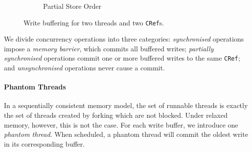 \begin{figure}
\begin{subfigure}{0.3\textwidth}
    \caption{Partial Store Order}
  \end{subfigure}
  \caption{Write buffering for two threads and two \texttt{CRef}s.}
  \label{fig:wb}
\end{figure}

We divide concurrency operations into three categories: \emph{synchronised}
operations impose a \emph{memory barrier}, which commits all buffered writes;
\emph{partially synchronised} operations commit one or more buffered writes to
the same \verb|CRef|; and \emph{unsynchronised} operations never cause a commit.

\paragraph{Phantom Threads}
In a sequentially consistent memory model, the set of runnable threads is
exactly the set of threads created by forking which are not blocked.  Under
relaxed memory, however, this is not the case.  For each write buffer, we
introduce one \emph{phantom thread}.  When scheduled, a phantom thread will
commit the oldest write in its corresponding buffer.

